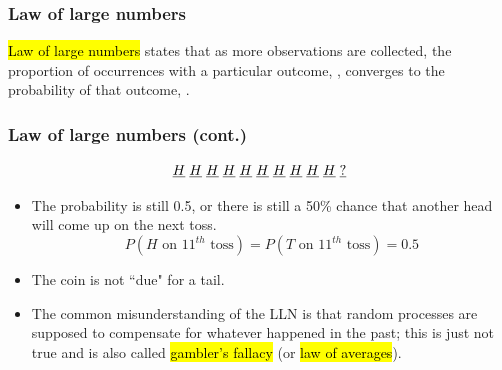 \documentclass[notes,11pt, aspectratio=169]{beamer}
\begin{document}

\begin{frame}
\frametitle{Law of large numbers}

\hl{Law of large numbers} states that as more observations are collected, the proportion of occurrences with a particular outcome, , converges to the probability of that outcome, .

\end{frame}


\begin{frame}
\frametitle{Law of large numbers (cont.)}


\[ \underline{H} \hspace{1mm} \underline{H} \hspace{1mm} \underline{H} \hspace{1mm} \underline{H} \hspace{1mm} \underline{H} \hspace{1mm} \underline{H} \hspace{1mm} \underline{H} \hspace{1mm} \underline{H} \hspace{1mm} \underline{H} \hspace{1mm} \underline{H} \hspace{1mm} \underline{?} \]

\begin{itemize}
\item<2-> The probability is still 0.5, or there is still a 50\% chance that another head will come up on the next toss.
\[ P(H \text{ on 11}^{th} \text{ toss}) = P(T \text{ on 11}^{th} \text{ toss}) = 0.5 \]
\item<3-> The coin is not ``due" for a tail.
\item<4-> The common misunderstanding of the LLN is that random processes are supposed to compensate for whatever happened in the past; this is just not true and is also called \hl{gambler's fallacy} (or \hl{law of averages}).
\end{itemize}

\end{frame}

\end{document}
